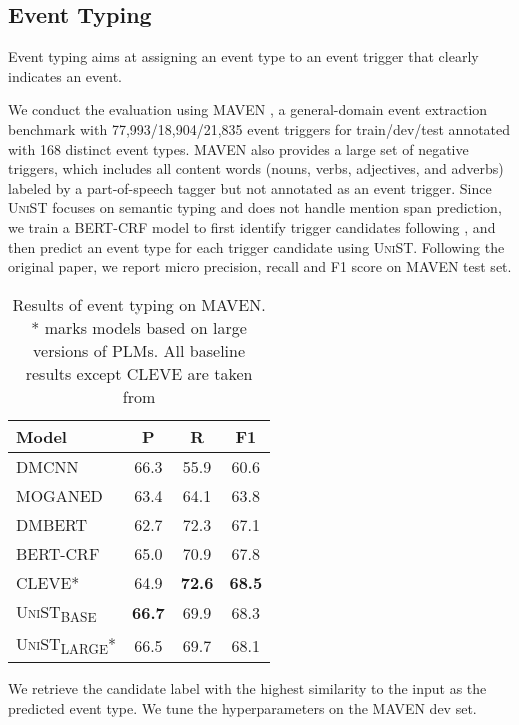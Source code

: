 \documentclass[11pt]{article}
\newcommand{\model}{\textsc{UniST}\xspace}
\newcommand{\basemodel}{\textsc{UniST}\textsubscript{BASE}}
\newcommand{\largemodel}{\textsc{UniST}\textsubscript{LARGE}}
\newcommand{\stitle}[1]{\vspace{1ex} \noindent{\bf #1}}
\begin{document}
\subsection{Event Typing} \label{event}
Event typing aims at assigning an event type to an event trigger that clearly indicates an event.

\stitle{Dataset.}
We conduct the evaluation using MAVEN \cite{wang-etal-2020-maven}, a general-domain event extraction benchmark with 77,993/18,904/21,835 event triggers for train/dev/test annotated with 168 distinct event types. MAVEN also provides a large set of negative triggers, which includes all content words (nouns, verbs, adjectives, and adverbs) labeled by a part-of-speech tagger but not annotated as an event trigger. Since \model focuses on semantic typing and does not handle mention span prediction, we train a BERT-CRF model to first identify trigger candidates following \citet{wang-etal-2020-maven}, and then predict an event type for each trigger candidate using \model. Following the original paper, we report micro precision, recall and F1 score on MAVEN test set.  

\begin{table}[t]
    \centering
    \small
    \begin{tabular}{l|ccc}
        \toprule
        Model & P & R & F1 \\
        \midrule
        DMCNN \cite{chen-etal-2015-event} & 66.3 & 55.9 & 60.6 \\
        MOGANED \cite{yan-etal-2019-event} & 63.4 & 64.1 & 63.8 \\
        DMBERT \cite{wang-etal-2019-adversarial-training} & 62.7 & 72.3 & 67.1 \\
        BERT-CRF \cite{wang-etal-2020-maven} & 65.0 & 70.9 & 67.8\\
        CLEVE* \cite{wang-etal-2021-cleve} & 64.9 & \textbf{72.6} & \textbf{68.5} \\
        \midrule
        \basemodel & \textbf{66.7} & 69.9 & 68.3\\
        \largemodel* & 66.5 & 69.7 & 68.1\\
        \bottomrule
    \end{tabular}
\caption{Results of event typing on MAVEN. * marks models based on large versions of PLMs. All baseline results except CLEVE are taken from \citet{wang-etal-2020-maven}}
    \label{tab:maven}
\end{table} 
\stitle{Model Configuration.}
We retrieve the candidate label with the highest similarity to the input as the predicted event type. We tune the hyperparameters on the MAVEN dev set.  
\end{document}

